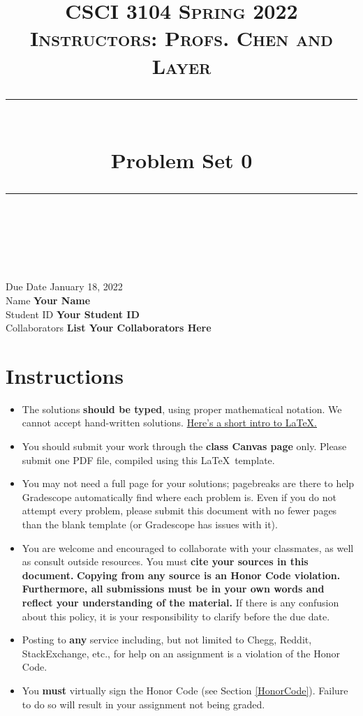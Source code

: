 \documentclass[11pt]{article}
\title{
\normalfont \normalsize 
\textsc{CSCI 3104 Spring 2022 \\ 
Instructors: Profs. Chen and Layer} \\
[10pt] 
\rule{\linewidth}{0.5pt} \\[6pt] 
\huge Problem Set 0 \\
\rule{\linewidth}{2pt}  \\[10pt]
}
\date{}
\theoremstyle{definition}
\theoremstyle{definition}
\theoremstyle{definition}
\begin{document}
\maketitle


\noindent
Due Date \dotfill January 18, 2022 \\
Name \dotfill \textbf{Your Name} \\
Student ID \dotfill \textbf{Your Student ID} \\
Collaborators \dotfill \textbf{List Your Collaborators Here}

\tableofcontents

\section{Instructions}
 \begin{itemize}
	\item The solutions \textbf{should be typed}, using proper mathematical notation. We cannot accept hand-written solutions. \href{http://ece.uprm.edu/~caceros/latex/introduction.pdf}{Here's a short intro to \LaTeX.}
	\item You should submit your work through the \textbf{class Canvas page} only. Please submit one PDF file, compiled using this \LaTeX \ template.
	\item You may not need a full page for your solutions; pagebreaks are there to help Gradescope automatically find where each problem is. Even if you do not attempt every problem, please submit this document with no fewer pages than the blank template (or Gradescope has issues with it).

	\item You are welcome and encouraged to collaborate with your classmates, as well as consult outside resources. You must \textbf{cite your sources in this document.} \textbf{Copying from any source is an Honor Code violation. Furthermore, all submissions must be in your own words and reflect your understanding of the material.} If there is any confusion about this policy, it is your responsibility to clarify before the due date. 

	\item Posting to \textbf{any} service including, but not limited to Chegg, Reddit, StackExchange, etc., for help on an assignment is a violation of the Honor Code.

	\item You \textbf{must} virtually sign the Honor Code (see Section \ref{HonorCode}). Failure to do so will result in your assignment not being graded.
\end{itemize}
\end{document}
